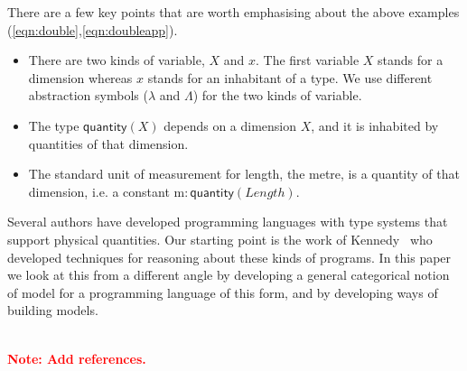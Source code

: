 \documentclass[a4paper,UKenglish]{lipics}
\newcommand\note[1]{{ \bf \textcolor{red} {\vspace{2mm}\; \\ Note: #1\\}}}
\newcommand{\msf}[1]{\mathsf{#1}} %
\newcommand{\qnt}{\msf{quantity}}
\newcommand{\lengthDim}{\mathit{Length}}
\newcommand{\Dvar}{X}
\begin{document}
\noindent There are a few key points that are worth emphasising about the above examples (\eqref{eqn:double},\eqref{eqn:doubleapp}).
\begin{itemize}
\item There are two kinds of variable, $\Dvar$ and $x$. The first variable $\Dvar$ stands for a dimension whereas $x$ stands for an inhabitant of a type. We use different abstraction symbols ($\lambda$ and $\Lambda$) for the two kinds of variable.
\item The type $\qnt(\Dvar)$ depends on a dimension $\Dvar$, and it is inhabited by quantities of that dimension.
\item The standard unit of measurement for length, the metre, is a quantity of that dimension, i.e. a constant $\mathrm m:\qnt(\lengthDim)$.
\end{itemize}

Several authors have developed programming languages with type systems
that support physical quantities. Our starting point is the work of
Kennedy~\cite{Kennedy:1997:RPU:263699.263761} who developed techniques
for reasoning about these kinds of programs. In this paper we look at
this from a different angle by developing a general categorical notion
of model for a programming language of this form, and by developing
ways of building models.

\note{Add references.}
\end{document}
